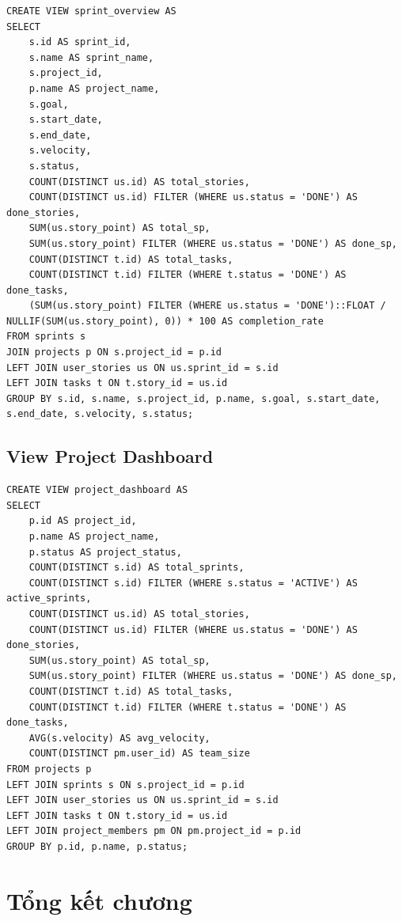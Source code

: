 \documentclass[12pt,a4paper]{report}
\begin{document}
\begin{verbatim}
CREATE VIEW sprint_overview AS
SELECT
    s.id AS sprint_id,
    s.name AS sprint_name,
    s.project_id,
    p.name AS project_name,
    s.goal,
    s.start_date,
    s.end_date,
    s.velocity,
    s.status,
    COUNT(DISTINCT us.id) AS total_stories,
    COUNT(DISTINCT us.id) FILTER (WHERE us.status = 'DONE') AS done_stories,
    SUM(us.story_point) AS total_sp,
    SUM(us.story_point) FILTER (WHERE us.status = 'DONE') AS done_sp,
    COUNT(DISTINCT t.id) AS total_tasks,
    COUNT(DISTINCT t.id) FILTER (WHERE t.status = 'DONE') AS done_tasks,
    (SUM(us.story_point) FILTER (WHERE us.status = 'DONE')::FLOAT / NULLIF(SUM(us.story_point), 0)) * 100 AS completion_rate
FROM sprints s
JOIN projects p ON s.project_id = p.id
LEFT JOIN user_stories us ON us.sprint_id = s.id
LEFT JOIN tasks t ON t.story_id = us.id
GROUP BY s.id, s.name, s.project_id, p.name, s.goal, s.start_date, s.end_date, s.velocity, s.status;
\end{verbatim}

\subsection{View Project Dashboard}

\begin{verbatim}
CREATE VIEW project_dashboard AS
SELECT
    p.id AS project_id,
    p.name AS project_name,
    p.status AS project_status,
    COUNT(DISTINCT s.id) AS total_sprints,
    COUNT(DISTINCT s.id) FILTER (WHERE s.status = 'ACTIVE') AS active_sprints,
    COUNT(DISTINCT us.id) AS total_stories,
    COUNT(DISTINCT us.id) FILTER (WHERE us.status = 'DONE') AS done_stories,
    SUM(us.story_point) AS total_sp,
    SUM(us.story_point) FILTER (WHERE us.status = 'DONE') AS done_sp,
    COUNT(DISTINCT t.id) AS total_tasks,
    COUNT(DISTINCT t.id) FILTER (WHERE t.status = 'DONE') AS done_tasks,
    AVG(s.velocity) AS avg_velocity,
    COUNT(DISTINCT pm.user_id) AS team_size
FROM projects p
LEFT JOIN sprints s ON s.project_id = p.id
LEFT JOIN user_stories us ON us.sprint_id = s.id
LEFT JOIN tasks t ON t.story_id = us.id
LEFT JOIN project_members pm ON pm.project_id = p.id
GROUP BY p.id, p.name, p.status;
\end{verbatim}

\section{Tổng kết chương}
\end{document}
